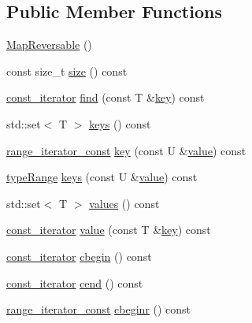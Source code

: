 \subsection*{Public Member Functions}
\begin{DoxyCompactItemize}
\item 
\hyperlink{classMapReversable_a70324d8f15d693e1de7e15a1293ddde2}{Map\+Reversable} ()
\item 
const size\+\_\+t \hyperlink{classMapReversable_aa21253c86298f61a18c215c7d4e8c048}{size} () const
\item 
\hyperlink{classMapReversable_a7a41e7d60ba284a59e7bf76c8c53e9c2}{const\+\_\+iterator} \hyperlink{classMapReversable_a30fd5b0e4e2578d3eaad8926a5d12cb2}{find} (const T \&\hyperlink{classMapReversable_a96492535f9aa469ffd75f28620b8ead4}{key}) const
\item 
std\+::set$<$ T $>$ \hyperlink{classMapReversable_a9587d6d95127e6941407af03584d3e00}{keys} () const
\item 
\hyperlink{classMapReversable_aed8c3cc9e7a8601664db79d56d117adf}{range\+\_\+iterator\+\_\+const} \hyperlink{classMapReversable_a96492535f9aa469ffd75f28620b8ead4}{key} (const U \&\hyperlink{classMapReversable_ad4b84d263ee939c25f45a0503f3b3c21}{value}) const
\item 
\hyperlink{classMapReversable_a00452d0ddb300578955ed93560508ad0}{type\+Range} \hyperlink{classMapReversable_aeeaeddaca58315c4a1c7f310f999694a}{keys} (const U \&\hyperlink{classMapReversable_ad4b84d263ee939c25f45a0503f3b3c21}{value}) const
\item 
std\+::set$<$ T $>$ \hyperlink{classMapReversable_a3c56d581fed9f1e05b5b6db86858ac6b}{values} () const
\item 
\hyperlink{classMapReversable_a7a41e7d60ba284a59e7bf76c8c53e9c2}{const\+\_\+iterator} \hyperlink{classMapReversable_ad4b84d263ee939c25f45a0503f3b3c21}{value} (const T \&\hyperlink{classMapReversable_a96492535f9aa469ffd75f28620b8ead4}{key}) const
\item 
\hyperlink{classMapReversable_a7a41e7d60ba284a59e7bf76c8c53e9c2}{const\+\_\+iterator} \hyperlink{classMapReversable_adf9c6326f843154f1da642003aa77396}{cbegin} () const
\item 
\hyperlink{classMapReversable_a7a41e7d60ba284a59e7bf76c8c53e9c2}{const\+\_\+iterator} \hyperlink{classMapReversable_acf794209bf91fe8f6026f090ccb7635f}{cend} () const
\item 
\hyperlink{classMapReversable_aed8c3cc9e7a8601664db79d56d117adf}{range\+\_\+iterator\+\_\+const} \hyperlink{classMapReversable_a12bfd506dad7f95bcbc7c9eb948e3464}{cbeginr} () const

\end{DoxyCompactItemize}
